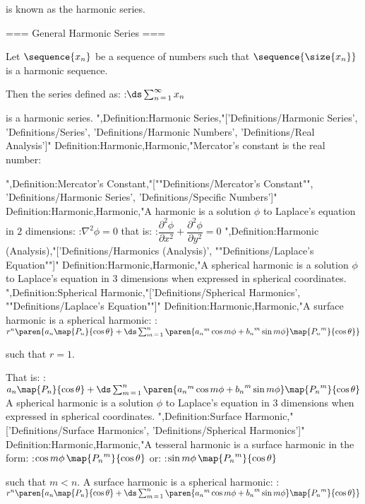 is known as the harmonic series.


=== General Harmonic Series ===

Let $\sequence {x_n}$ be a sequence of numbers such that $\sequence {\size {x_n} }$ is a harmonic sequence.


Then the series defined as:
:$\ds \sum_{n \mathop = 1}^\infty x_n$

is a harmonic series.
",Definition:Harmonic Series,"['Definitions/Harmonic Series', 'Definitions/Series', 'Definitions/Harmonic Numbers', 'Definitions/Real Analysis']"
Definition:Harmonic,Harmonic,"Mercator's constant is the real number:







",Definition:Mercator's Constant,"[""Definitions/Mercator's Constant"", 'Definitions/Harmonic Series', 'Definitions/Specific Numbers']"
Definition:Harmonic,Harmonic,"A harmonic is a solution $\phi$ to Laplace's equation in $2$ dimensions:
:$\nabla^2 \phi = 0$
that is:
:$\dfrac {\partial^2 \phi} {\partial x^2} + \dfrac {\partial^2 \phi} {\partial y^2} = 0$
",Definition:Harmonic (Analysis),"['Definitions/Harmonics (Analysis)', ""Definitions/Laplace's Equation""]"
Definition:Harmonic,Harmonic,"A spherical harmonic is a solution $\phi$ to Laplace's equation in $3$ dimensions when expressed in spherical coordinates.
",Definition:Spherical Harmonic,"['Definitions/Spherical Harmonics', ""Definitions/Laplace's Equation""]"
Definition:Harmonic,Harmonic,"A surface harmonic is a spherical harmonic:
:$r^n \paren {a_n \map {P_n} {\cos \theta} + \ds \sum_{m \mathop = 1}^n \paren { {a_n}^m \cos m \phi + {b_n}^m \sin m \phi} \map { {P_n}^m} {\cos \theta} }$

such that $r = 1$.

That is:
:$a_n \map {P_n} {\cos \theta} + \ds \sum_{m \mathop = 1}^n \paren { {a_n}^m \cos m \phi + {b_n}^m \sin m \phi} \map { {P_n}^m} {\cos \theta}$
A spherical harmonic is a solution $\phi$ to Laplace's equation in $3$ dimensions when expressed in spherical coordinates.
",Definition:Surface Harmonic,"['Definitions/Surface Harmonics', 'Definitions/Spherical Harmonics']"
Definition:Harmonic,Harmonic,"A tesseral harmonic is a surface harmonic in the form:
:$\cos m \phi \, \map { {P_n}^m} {\cos \theta}$
or:
:$\sin m \phi \, \map { {P_n}^m} {\cos \theta}$

such that $m < n$.
A surface harmonic is a spherical harmonic:
:$r^n \paren {a_n \map {P_n} {\cos \theta} + \ds \sum_{m \mathop = 1}^n \paren { {a_n}^m \cos m \phi + {b_n}^m \sin m \phi} \map { {P_n}^m} {\cos \theta} }$

